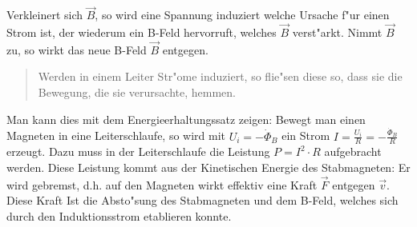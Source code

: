 Verkleinert sich $\vec B$, so wird eine Spannung induziert welche
Ursache f"ur einen Strom ist, der wiederum
ein B-Feld hervorruft, welches $\vec B$ verst"arkt. Nimmt $\vec B$ zu,
so wirkt das neue B-Feld $\vec B$ entgegen.

\begin{quote}
   Werden in einem Leiter Str"ome induziert, so flie"sen diese so,
   dass sie die Bewegung, die sie verursachte, hemmen.
\end{quote}


\abs
Man kann dies mit dem Energieerhaltungssatz zeigen: Bewegt man einen
Magneten in eine Leiterschlaufe, so wird mit $U_i = - \dot \Phi_B$ ein
Strom $I = \frac{U_i}{R} = - \frac{\dot \Phi_B}{R}$ erzeugt. Dazu muss
in der Leiterschlaufe die Leistung $P = I^2 \cdot R$ aufgebracht
werden. Diese Leistung kommt aus der Kinetischen Energie des
Stabmagneten: Er wird gebremst, d.h. auf den Magneten wirkt effektiv
eine Kraft $\vec F$ entgegen $\vec v$. Diese Kraft Ist die Absto"sung
des Stabmagneten und dem B-Feld, welches sich durch den
Induktionsstrom etablieren konnte.

